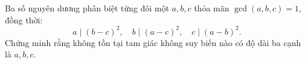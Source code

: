 \ifshowproblem
\begin{problem}[\gls{BW 2015}/P19]\label{example:BW-2015-P19}
    Ba số nguyên dương phân biệt từng đôi một \( a, b, c \) thỏa mãn \( \gcd(a,b,c) = 1 \), đồng thời:
    \[
        a \mid (b - c)^2,\quad b \mid (a - c)^2,\quad c \mid (a - b)^2.
    \]
    Chứng minh rằng không tồn tại tam giác không suy biến nào có độ dài ba cạnh là \( a, b, c \).
\end{problem}
\fi

\footnotemark
{}
\fi